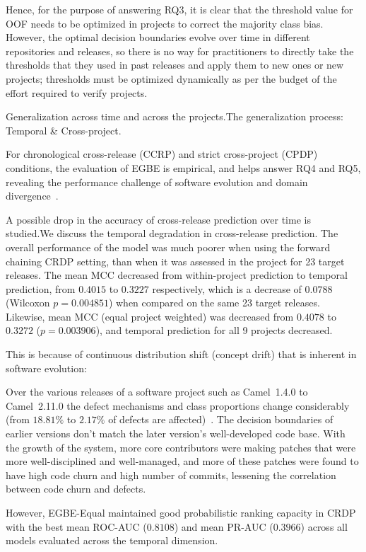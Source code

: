 \documentclass[conference]{IEEEtran}
\begin{document}
Hence, for the purpose of answering RQ3, it is clear that the threshold value for OOF needs to be optimized in projects to correct the majority class bias. However, the optimal decision boundaries evolve over time in different repositories and releases, so there is no way for practitioners to directly take the thresholds that they used in past releases and apply them to new ones or new projects; thresholds must be optimized dynamically as per the budget of the effort required to verify projects.~\cite{tantithamthavorn2019optimization}

Generalization across time and across the projects.The generalization process: Temporal & Cross-project.
\label{subsec:temporal-and-cross-project-generalization}

For chronological cross-release (CCRP) and strict cross-project (CPDP) conditions, the evaluation of EGBE is empirical, and helps answer RQ4 and RQ5, revealing the performance challenge of software evolution and domain divergence~\cite{sottomayor2024survey, turhan2009crosscompany}.

A possible drop in the accuracy of cross-release prediction over time is studied.We discuss the temporal degradation in cross-release prediction.
The overall performance of the model was much poorer when using the forward chaining CRDP setting, than when it was assessed in the project for 23 target releases. The mean MCC decreased from within-project prediction to temporal prediction, from $0.4015$ to $0.3227$ respectively, which is a decrease of $0.0788$ (Wilcoxon $p = 0.004851$) when compared on the same 23 target releases. Likewise, mean MCC (equal project weighted) was decreased from $0.4078$ to $0.3272$ ($p = 0.003906$), and temporal prediction for all 9 projects decreased. 

This is because of continuous distribution shift (concept drift) that is inherent in software evolution:
\begin{enumerate}
    Over the various releases of a software project such as Camel~1.4.0 to Camel~2.11.0 the defect mechanisms and class proportions change considerably (from $18.81\%$ to $2.17\%$ of defects are affected)~\cite{yatish2019affected}. The decision boundaries of earlier versions don't match the later version's well-developed code base.
    With the growth of the system, more core contributors were making patches that were more well-disciplined and well-managed, and more of these patches were found to have high code churn and high number of commits, lessening the correlation between code churn and defects.
\end{enumerate}
However, EGBE-Equal maintained good probabilistic ranking capacity in CRDP with the best mean ROC-AUC ($0.8108$) and mean PR-AUC ($0.3966$) across all models evaluated across the temporal dimension.
\end{document}
